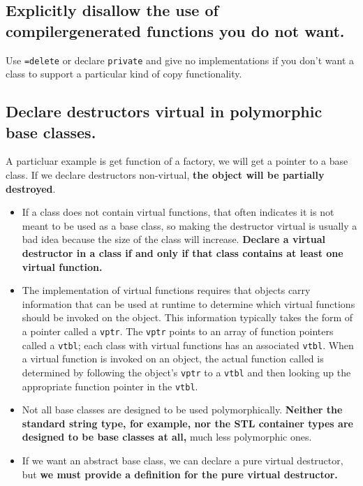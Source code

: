 \documentclass[a4paper,twoside]{article}
\theoremstyle{definition}
\theoremstyle{remark}
\numberwithin{equation}{section}
\let\OldTexttt\texttt
\renewcommand{\texttt}[1]{{\color{blue} \OldTexttt{#1}}}
\begin{document}
\subsection{Explicitly disallow the use of compilergenerated functions
  you do not want.}
\label{sec:Item-6}

Use \texttt{=delete} or declare \texttt{private} and give no
implementations if you don't want a class to support a particular
kind of copy functionality.

\subsection{Declare destructors virtual in polymorphic base classes.}
\label{sec:Item-7}

A particluar example is get function of a factory, we will get a
pointer to a base class. If we declare destructors non-virtual, \textbf{the
  object will be partially destroyed}.

\begin{itemize}
\item If a class does not contain virtual functions, that often indicates it is
not meant to be used as a base class, so making the
destructor virtual is usually a bad idea because the size of the
class will increase. \textbf{Declare a virtual destructor in a
class if and only if that class contains at least one virtual function.}
\item The implementation of virtual functions requires that objects carry
information that can be used at runtime to determine which virtual
functions should be invoked on the object. This information typically
takes the form of a pointer called a \texttt{vptr}. The
\texttt{vptr} points to an array of function pointers called a
\texttt{vtbl}; each class with virtual functions has an associated
\texttt{vtbl}. When a virtual function is invoked on an object, the
actual function called is determined by following the object's
\texttt{vptr} to a \texttt{vtbl} and then looking up the appropriate
function pointer in the \texttt{vtbl}. 
\item Not all base classes are designed to be used polymorphically. \textbf{Neither
the standard string type, for example, nor the STL container types are
designed to be base classes at all,} much less polymorphic ones.
\item If we want an abstract base class, we can declare a pure virtual
  destructor, but \textbf{we must provide a definition for the pure
    virtual destructor.}
\end{itemize}
\end{document}
